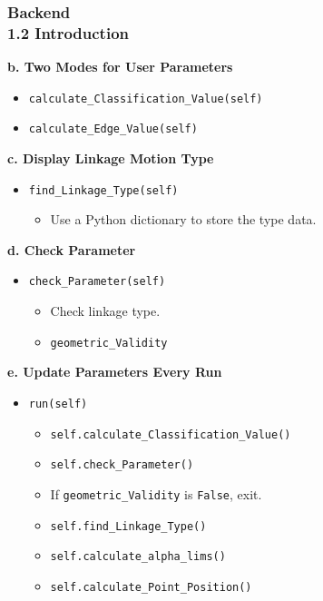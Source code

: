 \documentclass[ucs,10pt]{beamer}
\begin{document}
\begin{frame}
    \frametitle{Backend \\ \small \color{rwth-blue} 1.2 Introduction}
    \textbf{b. Two Modes for User Parameters}
    \begin{itemize}
        \item \texttt{calculate\_Classification\_Value(self)}
        \item \texttt{calculate\_Edge\_Value(self)}
    \end{itemize}

    \textbf{c. Display Linkage Motion Type}
    \begin{itemize}
        \item \texttt{find\_Linkage\_Type(self)}
        \begin{itemize}
            \item Use a Python dictionary to store the type data.
        \end{itemize}
    \end{itemize}

    \textbf{d. Check Parameter}
    \begin{itemize}
        \item \texttt{check\_Parameter(self)}
        \begin{itemize}
            \item Check linkage type.
            \item \texttt{geometric\_Validity}
        \end{itemize}
    \end{itemize}

    \textbf{e. Update Parameters Every Run}
    \begin{itemize}
        \item \texttt{run(self)}
        \begin{itemize}
            \item \texttt{self.calculate\_Classification\_Value()}
            \item \texttt{self.check\_Parameter()}
            \item If \texttt{geometric\_Validity} is \texttt{False}, exit.
            \item \texttt{self.find\_Linkage\_Type()}
            \item \texttt{self.calculate\_alpha\_lims()}
            \item \texttt{self.calculate\_Point\_Position()}
        \end{itemize}
    \end{itemize}
\end{frame}
\end{document}
